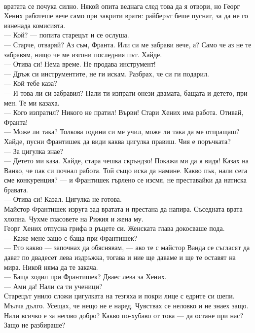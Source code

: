 \documentclass[12pt,a4paper]{article}
\begin{document}
\\
 вратата се почука силно. Някой опита веднага след това да я отвори, но Георг Хених работеше вече само при закрити врати: райберът беше пуснат, за да не го изненада комисията.
\\
— Кой? — попита старецът и се ослуша.
\\
— Старче, отваряй? Аз съм, Франта. Или си ме забрави вече, а? Само че аз не те забравям, нищо че ме изгони последния път. Хайде.
\\
— Отива си! Нема време. Не продава инструмент!
\\
— Дръж си инструментите, не ги искам. Разбрах, че си ги подарил.
\\
— Кой тебе каза?
\\
— И това ли си забравил? Нали ти изпрати онези двамата, бащата и детето, при мен. Те ми казаха.
\\
— Кого изпратил? Никого не пратил! Върви! Стари Хених има работа. Отивай, Франта!
\\
— Може ли така? Толкова години си ме учил, може ли така да ме отпращаш? Хайде, пусни Франтишек да види каква цигулка правиш. Чия е поръчката?
\\
— За цигулка знае?
\\
— Детето ми каза. Хайде, стара чешка скръндзо! Покажи ми да я видя! Казах на Ванко, че пак си почнал работа. Той също иска да намине. Какво пък, нали сега сме конкуренция? — и Франтишек гърлено се изсмя, не преставайки да натиска бравата.
\\
— Отива си! Казал. Цигулка не готова.
\\
Майстор Франтишек изруга зад вратата и престана да напира. Съседната врата хлопна. Чухме гласовете на Рижия и жена му.
\\
Георг Хених отпусна грифа в ръцете си. Женската глава докосваше пода.
\\
— Каже мене защо с баща при Франтишек?
\\
— Ето какво — започнах да обяснявам, — ако те с майстор Ванда се съгласят да дават по двадесет лева издръжка, тогава и ние ще даваме и ще те оставят на мира. Никой няма да те закача.
\\
— Баща ходил при Франтишек? Дваес лева за Хених.
\\
— Ами да! Нали са ти ученици?
\\
Старецът унило сложи цигулката на тезгяха и покри лице с едрите си шепи. Мълча дълго. Усещах, че нещо не е наред. Чувствах се неловко и не знаех защо. Нали всичко е за негово добро? Какво по-хубаво от това — да остане при нас? Защо не разбираше?
\end{document}
